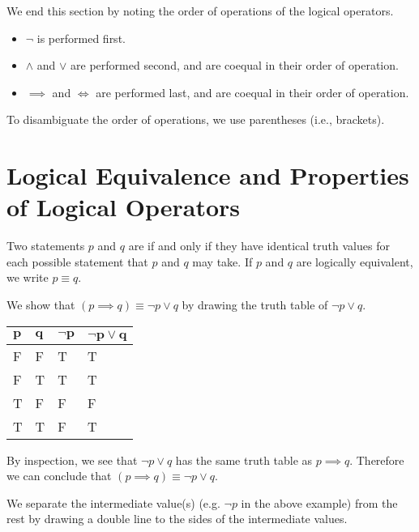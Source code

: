 We end this section by noting the order of operations of the logical operators.
\begin{itemize}
    \item $\lnot$ is performed first.
    \item $\land$ and $\lor$ are performed second, and are coequal in their order of operation.
    \item $\implies$ and $\iff$ are performed last, and are coequal in their order of operation.
\end{itemize}
To disambiguate the order of operations, we use parentheses (i.e., brackets).

\section{Logical Equivalence and Properties of Logical Operators}
\begin{definition}
    Two statements $p$ and $q$ are  if and only if they have identical truth values for each possible statement that $p$ and $q$ may take. If $p$ and $q$ are logically equivalent, we write $p \equiv q$.
\end{definition}

\begin{example}\label{example-implication-law}
    We show that $(p \implies q) \equiv \lnot p \lor q$ by drawing the truth table of $\lnot p \lor q$.
    \begin{table}[H]
        \centering
        \begin{tabular}{|l|l||l||l|}
            \hline
            $\boldsymbol{p}$ & $\boldsymbol{q}$ & $\boldsymbol{\lnot p}$ & $\boldsymbol{\lnot p \lor q}$ \\ \hline
            F   & F   & T         & T                  \\ \hline
            F   & T   & T         & T                  \\ \hline
            T   & F   & F         & F                  \\ \hline
            T   & T   & F         & T                  \\ \hline
        \end{tabular}
    \end{table}

    By inspection, we see that $\lnot p \lor q$ has the same truth table as $p \implies q$. Therefore we can conclude that $(p \implies q) \equiv \lnot p \lor q$.
\end{example}
\begin{remark}
    We separate the intermediate value(s) (e.g. $\lnot p$ in the above example) from the rest by drawing a double line to the sides of the intermediate values.
\end{remark}

